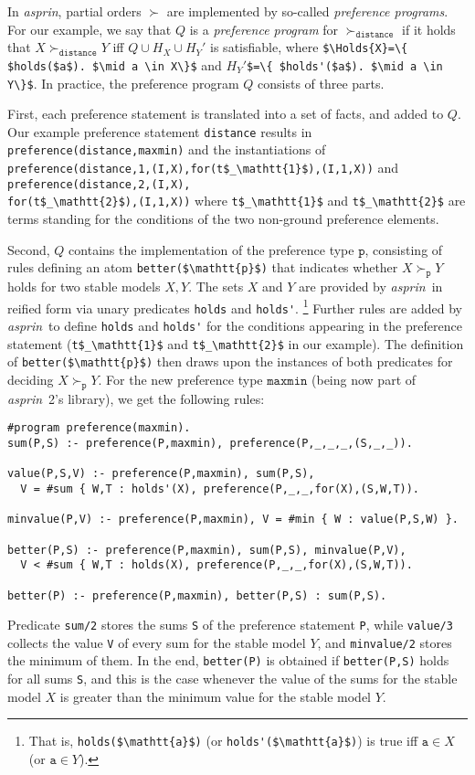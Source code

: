 \documentclass[a4paper,USenglish]{oasics-v2016}
\newcommand{\lm}[1]{\lstinline[mathescape=true]!#1!}
\newcommand{\Holds}[1]{\ensuremath{{H}_{#1}}} %
\newcommand{\Holdsp}[1]{\ensuremath{{H}_{#1}'}} %
\newcommand{\sysfont}{\textit}
\newcommand{\asprin}{\sysfont{asprin}}
\begin{document}
In \asprin, partial orders $\succ$ are implemented by so-called \emph{preference programs}. 
%
For our example, we say that $Q$ is a \emph{preference program} for $\succ_\mathtt{distance}$ if it holds that
$X \succ_\mathtt{distance} Y$ iff $Q \cup \Holds{X} \cup \Holdsp{Y}$ is satisfiable, 
where \lm{$\Holds{X}=\{ $holds($a$). $\mid a \in X\}$}
and   $\Holdsp{Y}$\lm{$=\{ $holds'($a$). $\mid a \in Y\}$}.
%
In practice, the preference program $Q$ consists of three parts.

%
First, %
each preference statement is translated into a set of facts, and added to $Q$.
Our example preference statement \lm{distance} results in
\lm{preference(distance,maxmin)} 
and the instantiations of 
\lm{preference(distance,1,(I,X),for(t$_\mathtt{1}$),(I,1,X))} 
and 
\lm{preference(distance,2,(I,X),} \\ \lm{for(t$_\mathtt{2}$),(I,1,X))}
where \lm{t$_\mathtt{1}$} and \lm{t$_\mathtt{2}$} are terms 
standing for the conditions of the two non-ground preference elements.

Second, %
$Q$ contains the implementation of the preference type $\mathtt{p}$,
consisting of rules defining an atom \lstinline[mathescape]!better($\mathtt{p}$)! 
that indicates whether $X\succ_{\mathtt{p}}Y$ holds for two stable models $X,Y$.
The sets $X$ and $Y$ are provided by \asprin\ in reified form via unary predicates \lstinline!holds! and \lstinline!holds'!\!.%
\footnote{That is, \lstinline[mathescape]!holds($\mathtt{a}$)!\! (or \lstinline!holds'!\!\!\lstinline[mathescape]!($\mathtt{a}$)!\!) is true iff $\mathtt{a}\!\in\!X$ (or $\mathtt{a}\!\in\!Y$).}
%
Further rules are added by \asprin\ to define \lstinline!holds! and \lstinline!holds'! for
the conditions appearing in the preference statement (\lm{t$_\mathtt{1}$} and \lm{t$_\mathtt{2}$} in our example).
%
The definition of \lstinline[mathescape]!better($\mathtt{p}$)! then draws upon the instances of both predicates for deciding $X\succ_{\mathtt{p}}Y$.
%
For the new preference type $\mathtt{maxmin}$ (being now part of \asprin\ 2's library),
we get the following rules:
%
\begin{lstlisting}
#program preference(maxmin).
sum(P,S) :- preference(P,maxmin), preference(P,_,_,_,(S,_,_)).

value(P,S,V) :- preference(P,maxmin), sum(P,S), 
  V = #sum { W,T : holds'(X), preference(P,_,_,for(X),(S,W,T)).

minvalue(P,V) :- preference(P,maxmin), V = #min { W : value(P,S,W) }.

better(P,S) :- preference(P,maxmin), sum(P,S), minvalue(P,V),
  V < #sum { W,T : holds(X), preference(P,_,_,for(X),(S,W,T)).

better(P) :- preference(P,maxmin), better(P,S) : sum(P,S).
\end{lstlisting}
Predicate \lm{sum/2} stores the sums \lm{S} of the preference statement \lm{P},  
while \lstinline!value/3! collects the value \lm{V} of every sum for the stable model $Y$, 
and \lstinline!minvalue/2! stores the minimum of them.
In the end, \lstinline{better(P)} is obtained if \lstinline{better(P,S)} holds for all sums \lm{S}, 
and this is the case whenever the value of the sums for the stable model $X$ 
is greater than the minimum value for the stable model $Y$.
\end{document}
